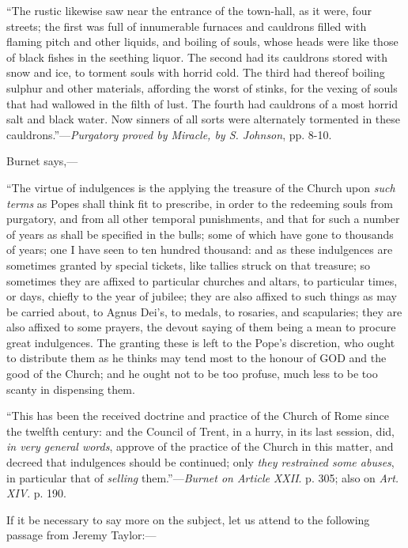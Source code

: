 ``The rustic likewise saw near the entrance of
the town-hall, as it were, four streets; the first was full of
innumerable furnaces and cauldrons filled with flaming pitch and other
liquids, and boiling of souls, whose heads were like those of black
fishes in the seething liquor. The second had its cauldrons stored
with snow and ice, to torment souls with horrid cold. The third had
thereof boiling sulphur and other materials, affording the worst of
stinks, for the vexing of souls that had wallowed in the filth of
lust. The fourth had cauldrons of a most horrid salt and black water.
Now sinners of all sorts were alternately tormented in these
cauldrons.''—\emph{Purgatory proved by Miracle, by S. Johnson},
pp. 8-10.


Burnet says,—

``The virtue of indulgences is the applying the
treasure of the Church upon \emph{such terms} as Popes shall think fit
to prescribe, in order to the redeeming souls from purgatory, and from
all other temporal punishments, and that for such a number of years as
shall be specified in the bulls; some of which have gone to thousands
of years; one I have seen to ten hundred thousand: and as these
indulgences are sometimes granted by special tickets, like tallies
struck on that treasure; so sometimes they are affixed to particular
churches and altars, to particular times, or days, chiefly to the year
of jubilee; they are also affixed to such things as may be carried
about, to Agnus Dei's, to medals, to rosaries, and scapularies; they
are also affixed to some prayers, the devout saying of them being a
mean to procure great indulgences. The granting these is left to the
Pope's discretion, who ought to distribute them as he thinks may tend
most to the honour of GOD
and the good of the Church; and he ought not to be too profuse, much
less to be too scanty in dispensing them.

``This has been the received doctrine and
practice of the Church of Rome since the twelfth century: and the
Council of Trent, in a hurry, in its last session, did, \emph{in very
general words}, approve of the practice of the Church in this
matter, and decreed that indulgences should be continued; only \emph{they
restrained some abuses}, in particular that of \emph{selling}
them.''—\emph{Burnet on Article XXII}. p. 305; also on \emph{Art.
XIV}. p. 190.

If it be necessary to say more on the subject, let us attend to the
following passage from Jeremy Taylor:—

